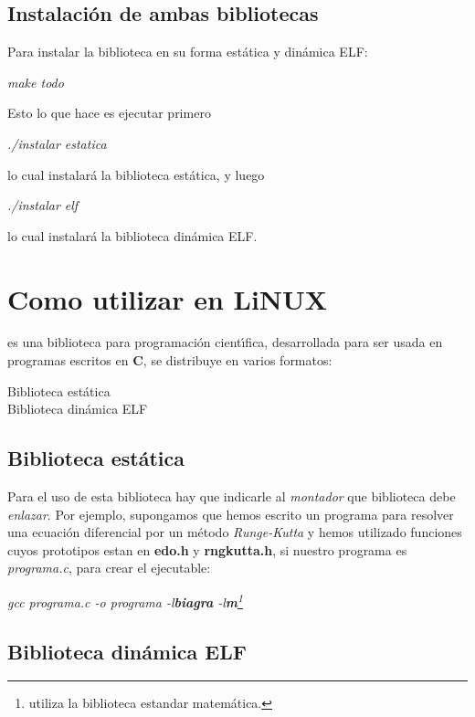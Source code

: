 \subsection{Instalaci\'on de ambas bibliotecas}
Para instalar la biblioteca \BI en su forma est\'atica y din\'amica ELF:

\begin{center}
\emph{make todo}
\end{center}

Esto lo que hace es ejecutar primero

\begin{center}
\emph{./instalar estatica}
\end{center}

lo cual instalar\'a la biblioteca est\'atica, y luego 

\begin{center}
\emph{./instalar elf}
\end{center}

lo cual instalar\'a la biblioteca din\'amica ELF.

\section{Como utilizar \BI en LiNUX}
\BI es una biblioteca para programaci\'on cient\'{\i}fica, 
desarrollada para ser usada en programas escritos en \textbf{C}, se
distribuye en varios formatos:

\begin{description}
\item[Biblioteca est\'atica]
\item[Biblioteca din\'amica ELF]
\end{description}

\subsection{Biblioteca est\'atica}
Para el uso de esta biblioteca hay que indicarle al \emph{montador} que
biblioteca debe \emph{enlazar}.
Por ejemplo, supongamos que hemos escrito un programa para resolver una
ecuaci\'on diferencial por un m\'etodo \emph{Runge-Kutta} y hemos utilizado
funciones cuyos prototipos estan en \textbf{edo.h} y \textbf{rngkutta.h}, si
nuestro programa es \mbox{\emph{programa.c}}, para crear el ejecutable:

\begin{center}
\emph{gcc programa.c -o programa -l\textbf{biagra} -l\textbf{m}\footnote{\BI 
utiliza la biblioteca estandar matem\'atica.}} 
\end{center}

\subsection{Biblioteca din\'amica ELF}
